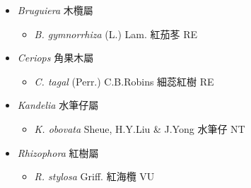 
  \begin{itemize}
 \item[] \textit{Bruguiera} 木欖屬
                                
  \begin{itemize}
        \item[] \textit{B. gymnorrhiza} (L.) Lam.  紅茄苳   RE
  \end{itemize}
 \item[] \textit{Ceriops} 角果木屬
                                
  \begin{itemize}
        \item[] \textit{C. tagal} (Perr.) C.B.Robins  細蕊紅樹   RE
  \end{itemize}
 \item[] \textit{Kandelia} 水筆仔屬
                                
  \begin{itemize}
        \item[] \textit{K. obovata} Sheue, H.Y.Liu \& J.Yong  水筆仔   NT
  \end{itemize}
 \item[] \textit{Rhizophora} 紅樹屬
                                
  \begin{itemize}
        \item[] \textit{R. stylosa} Griff.  紅海欖   VU
  \end{itemize}
  \end{itemize}
